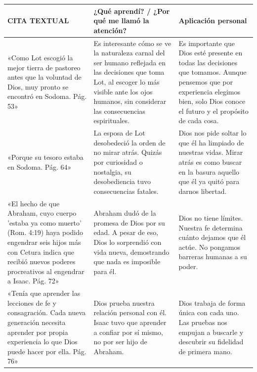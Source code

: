 \documentclass[12pt]{article}
\renewcommand{\arraybackslash}{\let\\\tabularnewline}
\begin{document}
\begin{longtable}{|>{\cellspace\raggedright\arraybackslash}p{5.5cm}|>{\cellspace\raggedright\arraybackslash}p{5.8cm}|>{\cellspace\raggedright\arraybackslash}p{5.8cm}|}
\hline
\textbf{CITA TEXTUAL} & \textbf{¿Qué aprendí? / ¿Por qué me llamó la atención?} & \textbf{Aplicación personal} \\
\hline
«Como Lot escogió la mejor tierra de pastoreo antes que la voluntad de Dios, muy pronto se encontró en Sodoma. Pág. 53» 
&
Es interesante cómo se ve la naturaleza carnal del ser humano reflejada en las decisiones que toma Lot, al escoger lo más visible ante los ojos humanos, sin considerar las consecuencias espirituales.
&
Es importante que Dios esté presente en todas las decisiones que tomamos. Aunque pensemos que por experiencia elegimos bien, solo Dios conoce el futuro y el propósito de cada cosa.
\\
\hline
«Porque su tesoro estaba en Sodoma. Pág. 64» 
&
La esposa de Lot desobedeció la orden de no mirar atrás. Quizás por curiosidad o nostalgia, su desobediencia tuvo consecuencias fatales.
&
Dios nos pide soltar lo que él ha limpiado de nuestras vidas. Mirar atrás es como buscar en la basura aquello que él ya quitó para darnos libertad.
\\
\hline
«El hecho de que Abraham, cuyo cuerpo 'estaba ya como muerto' (Rom. 4:19) haya podido engendrar seis hijos más con Cetura indica que recibió nuevos poderes procreativos al engendrar a Isaac. Pág. 72»
&
Abraham dudó de la promesa de Dios por su edad. A pesar de eso, Dios lo sorprendió con vida nueva, demostrando que nada es imposible para él.
&
Dios no tiene límites. Nuestra fe determina cuánto dejamos que él actúe. No pongamos barreras humanas a su poder.
\\
\hline
«Tenía que aprender las lecciones de fe y consagración. Cada nueva generación necesita aprender por propia experiencia lo que Dios puede hacer por ella. Pág. 76»
&
Dios prueba nuestra relación personal con él. Isaac tuvo que aprender a confiar por sí mismo, no por ser hijo de Abraham.
&
Dios trabaja de forma única con cada uno. Las pruebas nos empujan a buscarle y descubrir su fidelidad de primera mano.
\\
\hline
\end{longtable}
\end{document}
